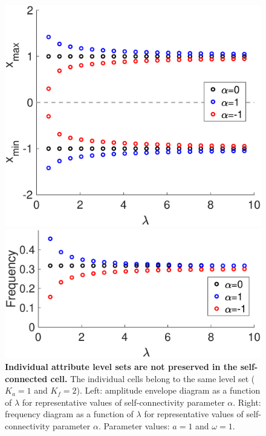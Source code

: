 \begin{figure}[htb]
\centering
  \begin{minipage}{0.45\linewidth}
  \centering
    \includegraphics[width=1\linewidth]{Images/photo9_1.eps} 
  \end{minipage} 
  \begin{minipage}{0.45\linewidth}
  \centering
    \includegraphics[width=1\linewidth]{Images/photo9_2.eps} 
  \end{minipage} 
  
  \caption{\textbf{Individual attribute level sets are not preserved in the self-connected cell.} The individual cells belong to the same level set ($K_{a}=1$ and $K_{f}=2$). Left: amplitude envelope diagram as a function of $\lambda$ for representative values of self-connectivity parameter $\alpha$. Right: frequency diagram as a function of $\lambda$ for representative values of self-connectivity parameter $\alpha$. Parameter values: $a = 1$ and $\omega = 1$.}
  \label{photo9}
\end{figure}

